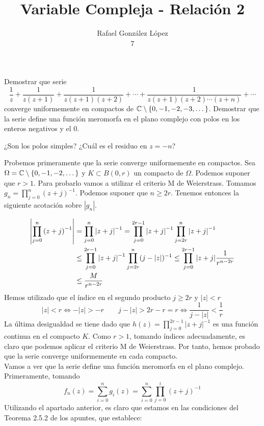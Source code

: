\documentclass[twoside]{article}
\begin{document}
\title{Variable Compleja - Relación 2}
\author{Rafael González López\\
7}
\maketitle
\begin{ejercicio}{1}
Demostrar que serie 
$$
\frac{1}{z}+\frac{1}{z(z+1)}+\frac{1}{z(z+1)(z+2)}+\cdots + \frac{1}{z(z+1)(z+2)\cdots  (z+n)}+\cdots$$
converge uniformemente en compactos de $\mathbb{C}\setminus\{0,-1,-2,-3,\dotsc\}$. Demostrar que la serie define una función meromorfa en el plano complejo con polos en los enteros negativos y el $0$.

¿Son los polos simples? ¿Cuál es el residuo en $z=-n$?
\begin{solucion}
Probemos primeramente que la serie converge uniformemente en compactos. Sea $\Omega = \mathbb{C}\setminus\{0,-1,-2,\dotsc\}$ y $K\subset B(0,r)$ un compacto de $\Omega$. Podemos suponer que $r>1$. Para probarlo vamos a utilizar el criterio M de Weierstrass. Tomamos $g_n = \prod_{j=0}^n \left(z+j\right)^{-1}$. Podemos suponer que $n\geq 2r$.  Tenemos entonces la siguiente acotación sobre $|g_n|$.

\begin{align*}
\left\lvert\prod_{j=0}^n \left(z+j\right)^{-1}\right\rvert &= \prod_{j=0}^n \left|z+j\right|^{-1} =  \prod_{j=0}^{2r-1}\left|z+j\right|^{-1}  \prod_{j=2r}^n \left|z+j\right|^{-1}\\
&\leq  \prod_{j=0}^{2r-1}\left|z+j\right|^{-1}  \prod_{j=2r}^n (j-|z|)^{-1} \leq \prod_{j=0}^{2r-1}|z+j|\frac{1}{r^{n-2r}}\\
& \leq \frac{M}{r^{n-2r}}
\end{align*}
Hemos utilizado que el índice en el segundo producto $j\geq 2r$ y $|z|<r$
$$
|z|<r \Leftrightarrow -|z|>-r \qquad j-|z|> 2r-r = r \Leftrightarrow \frac{1}{j-|z|}< \frac{1}{r}
$$
\newpage
La última desigualdad se tiene dado que $h(z)=\prod_{j=0}^{2r-1}|z+j|^{-1}$ es una función continua en el compacto $K$. Como $r>1$, tomando índices adecuadamente, es claro que podemos aplicar el criterio M de Weierstrass. Por tanto, hemos probado que la serie converge uniformemente en cada compacto.\\

Vamos a ver que la serie define una función meromorfa en el plano complejo. Primeramente, tomando 
$$
 f_n(z) = \sum_{i=0}^n g_i(z) = \sum_{i=0}^n \prod_{j=0}^i (z+j)^{-1}
$$
Utilizando el apartado anterior, es claro que estamos en las condiciones del Teorema 2.5.2 de los apuntes, que establece:


\end{solucion}
\end{ejercicio}
\end{document}
